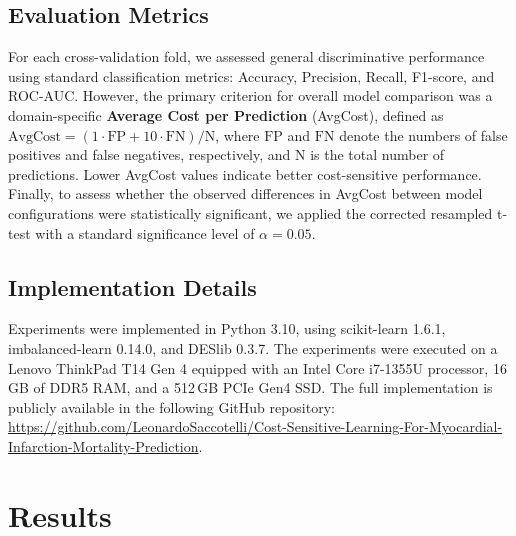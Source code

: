 \documentclass[conference]{IEEEtran}
\begin{document}
\subsection{Evaluation Metrics}
For each cross-validation fold, we assessed general discriminative performance using standard classification metrics: Accuracy, Precision, Recall, F1-score, and ROC-AUC. However, the primary criterion for overall model comparison was a domain-specific \textbf{Average Cost per Prediction} (AvgCost), defined as \(\text{AvgCost} = (1 \cdot \text{FP} + 10 \cdot \text{FN}) / \text{N}\), where \(\text{FP}\) and \(\text{FN}\) denote the numbers of false positives and false negatives, respectively, and \(\text{N}\) is the total number of predictions. Lower AvgCost values indicate better cost-sensitive performance. Finally, to assess whether the observed differences in AvgCost between model configurations were statistically significant, we applied the corrected resampled t-test with a standard significance level of $\alpha = 0.05$.

\subsection{Implementation Details}

Experiments were implemented in Python 3.10, using scikit-learn 1.6.1, imbalanced-learn 0.14.0, and DESlib 0.3.7. The experiments were executed on a Lenovo ThinkPad T14 Gen 4 equipped with an Intel Core i7-1355U processor, 16\,GB of DDR5 RAM, and a 512\,GB PCIe Gen4 SSD. The full implementation is publicly available in the following GitHub repository: \url{https://github.com/LeonardoSaccotelli/Cost-Sensitive-Learning-For-Myocardial-Infarction-Mortality-Prediction}. 

\section{Results} \label{sec:results}
\end{document}
